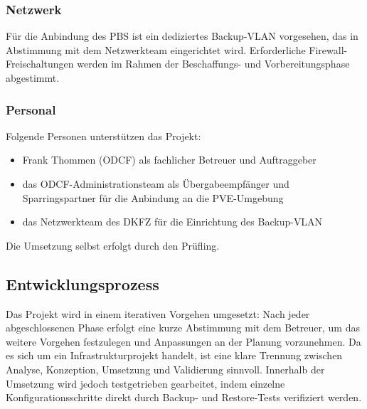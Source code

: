 \subsubsection{Netzwerk}
Für die Anbindung des \ac{PBS} ist ein dediziertes Backup-\ac{VLAN}
vorgesehen, das in Abstimmung mit dem Netzwerkteam eingerichtet wird.
Erforderliche Firewall-Freischaltungen werden im Rahmen der
Beschaffungs- und Vorbereitungsphase abgestimmt.

\subsubsection{Personal}
Folgende Personen unterstützen das Projekt:
\begin{itemize}
    \item Frank Thommen (\ac{ODCF}) als fachlicher Betreuer und Auftraggeber
    \item das \ac{ODCF}-Administrationsteam als Übergabeempfänger und Sparringspartner für die Anbindung an die \ac{PVE}-Umgebung
    \item das Netzwerkteam des \ac{DKFZ} für die Einrichtung des Backup-\ac{VLAN}
\end{itemize}
Die Umsetzung selbst erfolgt durch den Prüfling.

\subsection{Entwicklungsprozess}
\label{sec:Entwicklungsprozess}

Das Projekt wird in einem iterativen Vorgehen umgesetzt: Nach jeder
abgeschlossenen Phase erfolgt eine kurze Abstimmung mit dem Betreuer,
um das weitere Vorgehen festzulegen und Anpassungen an der Planung
vorzunehmen.
Da es sich um ein Infrastrukturprojekt handelt, ist eine klare
Trennung zwischen Analyse, Konzeption, Umsetzung und Validierung
sinnvoll. Innerhalb der Umsetzung wird jedoch testgetrieben
gearbeitet, indem einzelne Konfigurationsschritte direkt durch
Backup- und Restore-Tests verifiziert werden.
